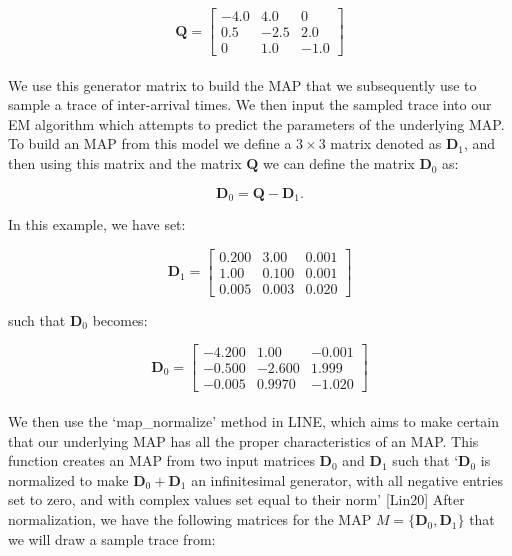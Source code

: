 \documentclass[a4paper,11pt,titlepage]{article}
\begin{document}
\begin{equation}
    \mathbf{Q} = 
\begin{bmatrix}
-4.0 & 4.0 & 0\\
0.5 & -2.5 & 2.0\\
0 & 1.0 & -1.0
\end{bmatrix}
\end{equation} \\

We use this generator matrix to build the MAP that we subsequently use to sample a trace of inter-arrival times. We then input the sampled trace into our EM algorithm which attempts to predict the parameters of the underlying MAP. To build an MAP from this model we define a $3 \times 3$ matrix denoted as $\mathbf{D}_1$, and then using this matrix and the matrix $\mathbf{Q}$ we can define the matrix $\mathbf{D}_0$ as:

\begin{equation}
    \mathbf{D}_0 = \mathbf{Q} - \mathbf{D}_1.
\end{equation}

In this example, we have set:

\begin{equation}
    \mathbf{D}_1 = 
\begin{bmatrix}
0.200 & 3.00 & 0.001\\
1.00 & 0.100 & 0.001\\
0.005 & 0.003 & 0.020
\end{bmatrix}
\end{equation}

such that $\mathbf{D}_0$ becomes: 

\begin{equation}
    \mathbf{D}_0 = 
\begin{bmatrix}
-4.200 & 1.00 & -0.001\\
-0.500 & -2.600 & 1.999\\
-0.005 & 0.9970 & -1.020
\end{bmatrix}
\end{equation} \\

We then use the `map\_normalize' method in LINE, which aims to make certain that our underlying MAP has all the proper characteristics of an MAP. This function creates an MAP from two input matrices $\mathbf{D}_0$ and $\mathbf{D}_1$ such that `$\mathbf{D}_0$ is normalized to make $\mathbf{D}_0+ \mathbf{D}_1$ an infinitesimal generator, with all negative entries set to zero, and with complex values set equal to their norm' [Lin20] After normalization, we have the following matrices for the MAP $M = \{\mathbf{D}_0, \mathbf{D}_1\}$ that we will draw a sample trace from:
\end{document}
